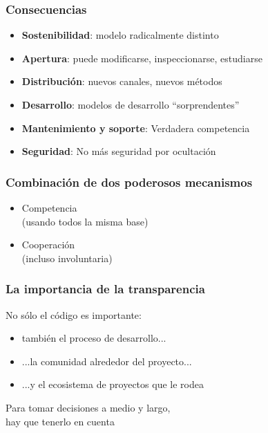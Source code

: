 \documentclass[17pt,aspectratio=169]{beamer}
\begin{document}
\begin{frame}
\frametitle{Consecuencias}

{\small
  \begin{itemize}
\item \textbf{Sostenibilidad}: modelo radicalmente distinto
\item \textbf{Apertura}: puede modificarse, inspeccionarse,
  estudiarse
\item \textbf{Distribución}: nuevos canales, nuevos métodos
\item \textbf{Desarrollo}: modelos de desarrollo ``sorprendentes''
\item \textbf{Mantenimiento y soporte}: Verdadera competencia
\item \textbf{Seguridad}: No más seguridad por ocultación
\end{itemize}
}
\end{frame}



\begin{frame}
\frametitle{Combinación de dos poderosos mecanismos}

{\Large
  \begin{itemize}
  \item Competencia \\
    (usando todos la misma base)
  \item Cooperación \\
    (incluso involuntaria)
\end{itemize}
}
\end{frame}


\begin{frame}
\frametitle{La importancia de la transparencia}

{\small
No sólo el código es importante:

\begin{itemize}
\item también el proceso de desarrollo...
\item ...la comunidad alrededor del proyecto...
\item ...y el ecosistema de proyectos que le rodea
\end{itemize}

Para tomar decisiones a medio y largo, \\
hay que tenerlo en cuenta \\
}
\end{frame}
\end{document}
